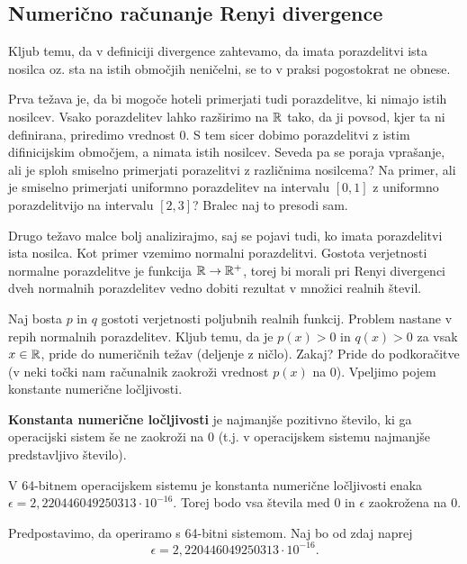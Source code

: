 \subsection{Numerično računanje Renyi divergence}

Kljub temu, da v definiciji divergence zahtevamo, da imata porazdelitvi ista nosilca oz. sta na istih območjih neničelni, se to v praksi pogostokrat ne obnese.

Prva težava je, da bi mogoče hoteli primerjati tudi porazdelitve, ki nimajo istih nosilcev. Vsako porazdelitev lahko razširimo na $\mathbb{R}$ tako, da ji povsod, kjer ta ni definirana, priredimo vrednost 0. S tem sicer dobimo porazdelitvi z istim difinicijskim območjem, a nimata istih nosilcev. Seveda pa se poraja vprašanje, ali je sploh smiselno primerjati porazelitvi z različnima nosilcema? Na primer, ali je smiselno primerjati uniformno porazdelitev na intervalu $[0, 1]$ z uniformno porazdelitvijo na intervalu $[2, 3]$? Bralec naj to presodi sam.

Drugo težavo malce bolj analizirajmo, saj se pojavi tudi, ko imata porazdelitvi ista nosilca. Kot primer vzemimo normalni porazdelitvi. Gostota verjetnosti normalne porazdelitve je funkcija $\mathbb{R} \rightarrow \mathbb{R}^+$, torej bi morali pri Renyi divergenci dveh normalnih porazdelitev vedno dobiti rezultat v množici realnih števil.

Naj bosta $p$ in $q$ gostoti verjetnosti poljubnih realnih funkcij. Problem nastane v repih normalnih porazdelitev. Kljub temu, da je $p(x) > 0$ in $q(x) > 0$ za vsak $x \in \mathbb{R}$, pride do numeričnih težav (deljenje z ničlo). Zakaj? Pride do podkoračitve (v neki točki nam računalnik zaokroži vrednost $p(x)$ na 0). Vpeljimo pojem konstante numerične ločljivosti.

\begin{definicija}
    \textbf{Konstanta numerične ločljivosti} je najmanjše pozitivno število, ki ga operacijski sistem še ne zaokroži na 0 (t.j. v operacijskem sistemu najmanjše predstavljivo število).
\end{definicija}

\begin{zgled}
    V 64-bitnem operacijskem sistemu je konstanta numerične ločljivosti enaka \\$\epsilon = 2,220446049250313 \cdot 10^{-16}$. Torej bodo vsa števila med 0 in $\epsilon$ zaokrožena na 0.
\end{zgled}

Predpostavimo, da operiramo s 64-bitni sistemom. Naj bo od zdaj naprej \begin{equation*}
    \epsilon = 2,220446049250313 \cdot 10^{-16}.
\end{equation*}

